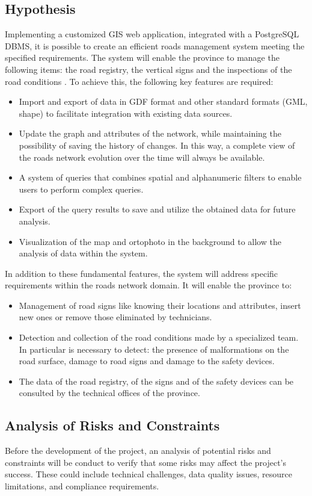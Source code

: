 \subsection{Hypothesis}
Implementing a customized GIS web application, integrated with a PostgreSQL DBMS, it is possible to create an efficient roads management system meeting the specified requirements. The system will enable the province to manage the following items: the road registry, the vertical signs and the inspections of the road conditions . To achieve this, the following key features are required:
\begin{itemize}
\item Import and export of data in GDF format and other standard formats (GML, shape) to facilitate integration with existing data sources.
\item Update the graph and attributes of the network, while maintaining the possibility of saving the history of changes. In this way, a complete view of the roads network evolution over the time will always be available.
\item A system of queries that combines spatial and alphanumeric filters to enable users to perform complex queries.
\item Export of the query results to save and utilize the obtained data for future analysis.
\item Visualization of the map and ortophoto in the background to allow the analysis of data within the system.
\end{itemize}
In addition to these fundamental features, the system will address specific requirements within the roads network domain. It will enable the province to:
\begin{itemize}
\item Management of road signs like knowing their locations and attributes, insert new ones or remove those eliminated by technicians.
\item Detection and collection of the road conditions made by a specialized team. In particular is necessary to detect: the presence of malformations on the road surface, damage to road signs and damage to the safety devices.
\item The data of the road registry, of the signs and of the safety devices can be consulted by the technical offices of the province.
\end{itemize}
\subsection{Analysis of Risks and Constraints}
Before the development of the project, an analysis of potential risks and constraints will be conduct to verify that some risks  may affect the project’s success. These could include technical challenges, data quality issues, resource limitations, and compliance requirements. 
